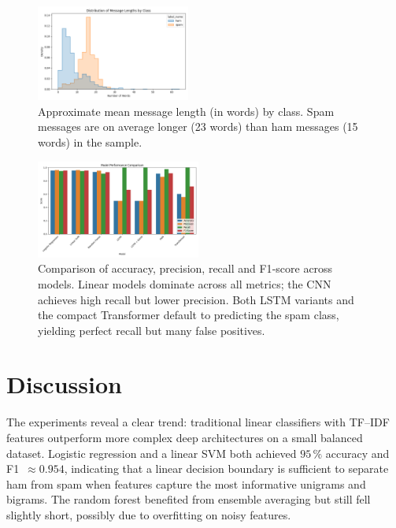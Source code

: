 \documentclass[conference]{IEEEtran}
\begin{document}
\begin{figure}[t]
  \centering
  \includegraphics[width=0.45\textwidth]{fig_mean_len.png}
  \caption{Approximate mean message length (in words) by class.  Spam messages are on average longer (23 words) than ham messages (15 words) in the sample.}
  \label{fig:lengths}
\end{figure}

\begin{figure}[t]
  \centering
  \includegraphics[width=0.48\textwidth]{fig_model_perf.png}
  \caption{Comparison of accuracy, precision, recall and F1‑score across models.  Linear models dominate across all metrics; the CNN achieves high recall but lower precision.  Both LSTM variants and the compact Transformer default to predicting the spam class, yielding perfect recall but many false positives.}
  \label{fig:modelperf}
\end{figure}

\section{Discussion}

The experiments reveal a clear trend: traditional linear classifiers with TF--IDF features outperform more complex deep architectures on a small balanced dataset. Logistic regression and a linear SVM both achieved $95\,\%$ accuracy and F1~$\approx 0.954$, indicating that a linear decision boundary is sufficient to separate ham from spam when features capture the most informative unigrams and bigrams. The random forest benefited from ensemble averaging but still fell slightly short, possibly due to overfitting on noisy features.
\end{document}
